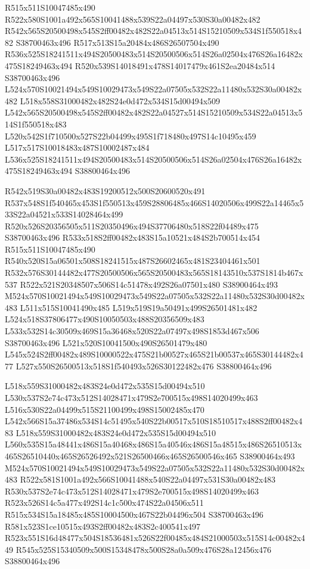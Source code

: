 \documentclass{article}
\begin{document}
\begin{multicols}{2}
R515x511S10047485x490 R522x580S1001a492x565S10041488x539S22a04497x530S30a00482x482 R542x565S20500498x545S2ff00482x482S22a04513x514S15210509x534S1f550518x482 S38700463x496 R517x513S15a20484x486S26507504x490 R536x525S18241511x494S20500483x514S20500506x514S26a02504x476S26a16482x475S18249463x494 R520x539S14018491x478S14017479x461S2ea20484x514 S38700463x496 L524x570S10021494x549S10029473x549S22a07505x532S22a11480x532S30a00482x482 L518x558S31000482x482S24e0d472x534S15d00494x509 L542x565S20500498x545S2ff00482x482S22a04527x514S15210509x534S22a04513x514S1f550518x483 L520x542S1f710500x527S22b04499x495S1f718480x497S14c10495x459 L517x517S10018483x487S10002487x484 L536x525S18241511x494S20500483x514S20500506x514S26a02504x476S26a16482x475S18249463x494 S38800464x496

R542x519S30a00482x483S19200512x500S20600520x491 R537x548S1f540465x453S1f550513x459S28806485x466S14020506x499S22a14465x533S22a04521x533S14028464x499 R520x526S20356505x511S20350496x494S37706480x518S22f04489x475 S38700463x496 R533x518S2ff00482x483S15a10521x484S2b700514x454 R515x511S10047485x490 R540x520S15a06501x508S18241515x487S26602465x481S23404461x501 R532x576S30144482x477S20500506x565S20500483x565S18143510x537S1814b467x537 R522x521S20348507x506S14c51478x492S26a07501x480 S38900464x493 M524x570S10021494x549S10029473x549S22a07505x532S22a11480x532S30d00482x483 L511x515S10041490x485 L519x519S19a50491x499S26501481x482 L524x518S37806477x490S10050503x488S20356509x483 L533x532S14c30509x469S15a36468x520S22a07497x498S1853d467x506 S38700463x496 L521x520S10041500x490S26501479x480 L545x524S2ff00482x489S10000522x475S21b00527x465S21b00537x465S30144482x477 L527x550S26500513x518S1f540493x526S30122482x476 S38800464x496

L518x559S31000482x483S24e0d472x535S15d00494x510 L530x537S2e74c473x512S14028471x479S2e700515x498S14020499x463 L516x530S22a04499x515S21100499x498S15002485x470 L542x566S15a37486x534S14c51495x540S22b00517x510S18510517x488S2ff00482x483 L518x559S31000482x483S24e0d472x535S15d00494x510 L560x535S15a48441x486S15a40468x486S15a40546x486S15a48515x486S26510513x465S26510440x465S26526492x521S26500466x465S26500546x465 S38900464x493 M524x570S10021494x549S10029473x549S22a07505x532S22a11480x532S30d00482x483 R522x581S1001a492x566S10041488x540S22a04497x531S30a00482x483 R530x537S2e74c473x512S14028471x479S2e700515x498S14020499x463 R523x526S14c5a477x492S14c1c500x474S22a04506x511 R515x534S15a18485x485S10004500x467S22b04496x504 S38700463x496 R581x523S1ce10515x493S2ff00482x483S2c400541x497 R523x551S16d48477x504S18536481x526S22f00485x484S21000503x515S14c00482x449 R545x525S15340509x500S15348478x500S28a0a509x476S28a12456x476 S38800464x496


\end{multicols}
\end{document}
